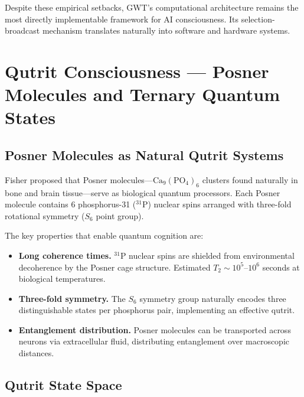 \documentclass[12pt,a4paper]{article}
\begin{document}
\noindent
Despite these empirical setbacks, GWT's computational architecture remains
the most directly implementable framework for AI consciousness. Its
selection-broadcast mechanism translates naturally into software and hardware
systems.

\section{Qutrit Consciousness --- Posner Molecules and Ternary Quantum States}
\label{sec:qutrits}

\subsection{Posner Molecules as Natural Qutrit Systems}

Fisher \cite{Fisher2015} proposed that Posner molecules---$\mathrm{Ca}_9(\mathrm{PO}_4)_6$
clusters found naturally in bone and brain tissue---serve as biological quantum
processors. Each Posner molecule contains 6 phosphorus-31 (${}^{31}\mathrm{P}$)
nuclear spins arranged with three-fold rotational symmetry ($S_6$ point group).

The key properties that enable quantum cognition are:

\begin{itemize}[leftmargin=2em]
  \item \textbf{Long coherence times.} ${}^{31}\mathrm{P}$ nuclear spins are
    shielded from environmental decoherence by the Posner cage structure.
    Estimated $T_2 \sim 10^5$--$10^6$ seconds at biological temperatures.
  \item \textbf{Three-fold symmetry.} The $S_6$ symmetry group naturally
    encodes three distinguishable states per phosphorus pair, implementing
    an effective qutrit.
  \item \textbf{Entanglement distribution.} Posner molecules can be
    transported across neurons via extracellular fluid, distributing
    entanglement over macroscopic distances.
\end{itemize}

\subsection{Qutrit State Space}
\end{document}

